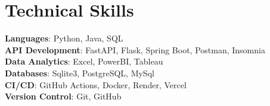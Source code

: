 \documentclass[letterpaper,11pt]{article}
\begin{document}
%
\section{Technical Skills}
 \begin{itemize}[leftmargin=0.15in, label={}]
	\small{\item{
	\textbf{Languages}{: Python, Java, SQL} \\
	\textbf{API Development}{: FastAPI, Flask, Spring Boot, Postman, Insomnia} \\
	\textbf{Data Analytics}{: Excel, PowerBI, Tableau} \\
	\textbf{Databases}{: Sqlite3, PostgreSQL, MySql} \\
	\textbf{CI/CD}{: GitHub Actions, Docker, Render, Vercel} \\
	\textbf{Version Control}{: Git, GitHub} \\
	}}
 \end{itemize}
 \vspace{-16pt}
\end{document}
